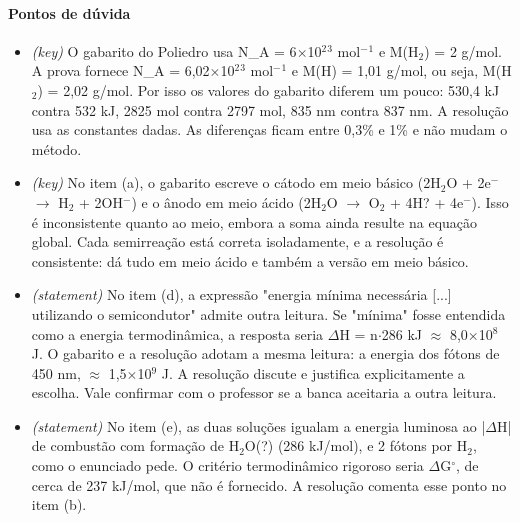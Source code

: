 \documentclass{article}%
\begin{document}
\paragraph{Pontos de dúvida}%
\begin{itemize}%
\item%
\textit{(key)} O gabarito do Poliedro usa N\_A = 6$\times$10$^2$$^3$ mol$^{-}$$^{1}$ e M(H$_{2}$) = 2 g/mol. A prova fornece N\_A = 6,02$\times$10$^2$$^3$ mol$^{-}$$^{1}$ e M(H) = 1,01 g/mol, ou seja, M(H$_{2}$) = 2,02 g/mol. Por isso os valores do gabarito diferem um pouco: 530,4 kJ contra 532 kJ, 2825 mol contra 2797 mol, 835 nm contra 837 nm. A resolução usa as constantes dadas. As diferenças ficam entre 0,3\% e 1\% e não mudam o método.%
\item%
\textit{(key)} No item (a), o gabarito escreve o cátodo em meio básico (2H$_{2}$O + 2e$^{-}$ $\to$ H$_{2}$ + 2OH$^{-}$) e o ânodo em meio ácido (2H$_{2}$O $\to$ O$_{2}$ + 4H? + 4e$^{-}$). Isso é inconsistente quanto ao meio, embora a soma ainda resulte na equação global. Cada semirreação está correta isoladamente, e a resolução é consistente: dá tudo em meio ácido e também a versão em meio básico.%
\item%
\textit{(statement)} No item (d), a expressão "energia mínima necessária {[}...{]} utilizando o semicondutor" admite outra leitura. Se "mínima" fosse entendida como a energia termodinâmica, a resposta seria $\Delta$H = n$\cdot$286 kJ $\approx$ 8,0$\times$10$^{8}$ J. O gabarito e a resolução adotam a mesma leitura: a energia dos fótons de 450 nm, $\approx$ 1,5$\times$10$^{9}$ J. A resolução discute e justifica explicitamente a escolha. Vale confirmar com o professor se a banca aceitaria a outra leitura.%
\item%
\textit{(statement)} No item (e), as duas soluções igualam a energia luminosa ao |$\Delta$H| de combustão com formação de H$_{2}$O(?) (286 kJ/mol), e 2 fótons por H$_{2}$, como o enunciado pede. O critério termodinâmico rigoroso seria $\Delta$G$^\circ$, de cerca de 237 kJ/mol, que não é fornecido. A resolução comenta esse ponto no item (b).%
\end{itemize}%
\end{document}

